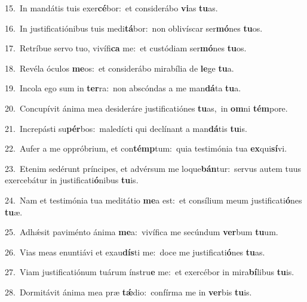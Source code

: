 {\numbfont\textcolor{\numbcolor}{15.}}~In mandátis tuis exer\-\textbf{cé}\-bor:~\star et considerábo \textbf{vi}\-as \textbf{tu}\-as.\par
{\numbfont\textcolor{\numbcolor}{16.}}~In justificatiónibus tuis medi\-\textbf{tá}\-bor:~\star non oblivíscar ser\-\textbf{mó}\-nes \textbf{tu}\-os.\par
{\numbfont\textcolor{\numbcolor}{17.}}~Retríbue servo tuo, vivífi\textbf{ca} me:~\star et custódiam ser\-\textbf{mó}\-nes \textbf{tu}\-os.\par
{\numbfont\textcolor{\numbcolor}{18.}}~Revéla óculos \textbf{me}\-os:~\star et considerábo mirabília de \textbf{le}\-ge \textbf{tu}\-a.\par
{\numbfont\textcolor{\numbcolor}{19.}}~Incola ego sum in \textbf{ter}\-ra:~\star non abscóndas a me man\-\textbf{dá}\-ta \textbf{tu}\-a.\par
{\numbfont\textcolor{\numbcolor}{20.}}~Concupívit ánima mea desideráre justificatiónes \textbf{tu}\-as,~\star in \textbf{om}\-ni \textbf{tém}\-pore.\par
{\numbfont\textcolor{\numbcolor}{21.}}~Increpásti su\-\textbf{pér}\-bos:~\star maledícti qui declínant a man\-\textbf{dá}\-tis \textbf{tu}\-is.\par
{\numbfont\textcolor{\numbcolor}{22.}}~Aufer a me oppróbrium, et con\-\textbf{témp}\-tum:~\star quia testimónia tua \textbf{ex}\-qui\-\textbf{sí}\-vi.\par
{\numbfont\textcolor{\numbcolor}{23.}}~Etenim sedérunt príncipes, et advérsum me loque\-\textbf{bán}\-tur:~\star servus autem tuus exercebátur in justificati\-\textbf{ó}\-nibus \textbf{tu}\-is.\par
{\numbfont\textcolor{\numbcolor}{24.}}~Nam et testimónia tua meditátio \textbf{me}\-a est:~\star et consílium meum justificati\-\textbf{ó}\-nes \textbf{tu}\-æ.\par
{\numbfont\textcolor{\numbcolor}{25.}}~Adhǽsit paviménto ánima \textbf{me}\-a:~\star vivífica me secúndum \textbf{ver}\-bum \textbf{tu}\-um.\par
{\numbfont\textcolor{\numbcolor}{26.}}~Vias meas enuntiávi et exau\-\textbf{dís}\-ti me:~\star doce me justificati\-\textbf{ó}\-nes \textbf{tu}\-as.\par
{\numbfont\textcolor{\numbcolor}{27.}}~Viam justificatiónum tuárum ínstru\textbf{e} me:~\star et exercébor in mira\-\textbf{bí}\-libus \textbf{tu}\-is.\par
{\numbfont\textcolor{\numbcolor}{28.}}~Dormitávit ánima mea præ \textbf{tǽ}\-dio:~\star confírma me in \textbf{ver}\-bis \textbf{tu}\-is.\par
